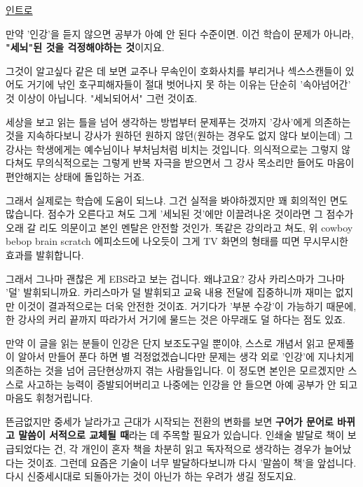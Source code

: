 \href{https://www.youtube.com/watch?v=dD2ggMnjgbg}{인트로}


만약 '인강'을 듣지 않으면 공부가 아예 안 된다 수준이면.
이건 학습이 문제가 아니라, \textbf{"세뇌"된 것을 걱정해야하는 것}이지요.
\vspace{5mm}

그것이 알고싶다 같은 데 보면 교주나 무속인이 호화사치를 부리거나 섹스스캔들이 있어도
거기에 낚인 호구피해자들이 절대 벗어나지 못 하는 이유는 단순히 '속아넘어간' 것 이상이 아닙니다.
"세뇌되어서" 그런 것이죠.
\vspace{5mm}

세상을 보고 읽는 틀을 넘어 생각하는 방법부터 문제푸는 것까지 '강사'에게 의존하는 것을 지속하다보니
강사가 원하던 원하지 않던(원하는 경우도 없지 않다 보이는데) 그 강사는 학생에게는 예수님이나 부처님처럼 비치는 것입니다.
의식적으로는 그렇지 않다쳐도 무의식적으로는 그렇게 반복 자극을 받으면서 그 강사 목소리만 들어도 마음이 편안해지는 상태에 돌입하는 거죠.
\vspace{5mm}

그래서 실제로는 학습에 도움이 되느냐. 그건 실적을 봐야하겠지만 꽤 회의적인 면도 많습니다.
점수가 오른다고 쳐도 그게 '세뇌된 것'에만 이끌려나온 것이라면 그 점수가 오래 갈 리도 의문이고 본인 멘탈은 안전할 것인가.
똑같은 강의라고 쳐도, 위 cowboy bebop brain scratch 에피소드에 나오듯이 그게 TV 화면의 형태를 띠면 무시무시한 효과를 발휘합니다.
\vspace{5mm}

그래서 그나마 괜찮은 게 EBS라고 보는 겁니다. 왜냐고요? 강사 카리스마가 그나마 '덜' 발휘되니까요.
카리스마가 덜 발휘되고 교육 내용 전달에 집중하니까 재미는 없지만 이것이 결과적으로는 더욱 안전한 것이죠.
거기다가 '부분 수강'이 가능하기 때문에, 한 강사의 커리 끝까지 따라가서 거기에 물드는 것은 아무래도 덜 하다는 점도 있죠.
\vspace{5mm}

만약 이 글을 읽는 분들이 인강은 단지 보조도구일 뿐이야, 스스로 개념서 읽고 문제풀이 알아서 만들어 푼다 하면 별 걱정없겠습니다만
문제는 생각 외로 '인강'에 지나치게 의존하는 것을 넘어 금단현상까지 겪는 사람들입니다.
이 정도면 본인은 모르겠지만 스스로 사고하는 능력이 증발되어버리고 나중에는 인강을 안 들으면 아예 공부가 안 되고 마음도 휘청거립니다.
\vspace{5mm}

뜬금없지만 중세가 날라가고 근대가 시작되는 전환의 변화를 보면
\textbf{구어가 문어로 바뀌고 말씀이 서적으로 교체될 때}라는 데 주목할 필요가 있습니다.
인쇄술 발달로 책이 보급되었다는 건, 각 개인이 혼자 책을 차분히 읽고 독자적으로 생각하는 경우가 늘어났다는 것이죠.
그런데 요즘은 기술이 너무 발달하다보니까 다시 '말씀이 책'을 앞섭니다. 다시 신중세시대로 되돌아가는 것이 아닌가 하는 우려가 생길 정도지요.
\vspace{5mm}






